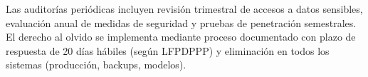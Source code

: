 Las auditorías periódicas incluyen revisión trimestral de accesos a datos sensibles, evaluación anual de medidas de seguridad y pruebas de penetración semestrales. El derecho al olvido se implementa mediante proceso documentado con plazo de respuesta de 20 días hábiles (según LFPDPPP) y eliminación en todos los sistemas (producción, backups, modelos).


